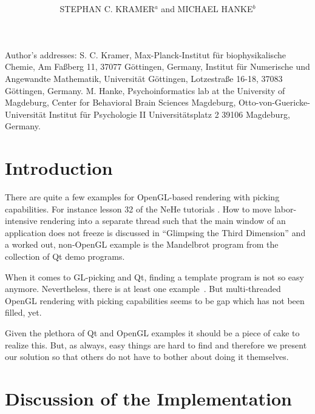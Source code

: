 \documentclass[prodmode,acmtopc]{acmsmall}
\title{
\mytitle
 }
\author{STEPHAN C. KRAMER$^a$  and MICHAEL HANKE$^b$
 \affil{$^a$Universit\"at G\"ottingen, $^b$Universit\"at Magdeburg}
 }
\begin{document}
                 \begin{bottomstuff}
                 Author's addresses: S. C. Kramer, 
                 Max-Planck-Institut f\"ur biophysikalische Chemie,
                 Am Fa\ss{}berg 11,
                 37077 G\"ottingen, Germany,
                 Institut f\"ur Numerische und Angewandte Mathematik, 
                 Universit\"at G\"ottingen, 
                 Lotzestra\ss{}e 16-18, 37083 G\"ottingen, Germany.
                 M. Hanke,
                 Psychoinformatics lab at the University of Magdeburg,
                 Center for Behavioral Brain Sciences Magdeburg,
                 Otto-von-Guericke-Universität
                 Institut  f\"ur Psychologie II
                 Universit\"atsplatz 2
                 39106 Magdeburg, Germany.
                 \end{bottomstuff}
                
 \maketitle %


\section{Introduction}
\label{sec:Introduction}

There are quite a few examples for OpenGL-based rendering with picking capabilities.
%
For instance lesson 32 of the NeHe tutorials \cite{nehe32}. 
%
How to move labor-intensive rendering into a separate thread such that the main window of an application does not freeze is discussed in ``Glimpsing the Third Dimension'' \cite{glimpse3d} and a worked out, non-OpenGL example is the Mandelbrot program from the collection of Qt demo programs.

When it comes to GL-picking and Qt, finding a template program is not so easy anymore.
%
Nevertheless, there is at least one example~\cite{Blanchette2008}.
%
But multi-threaded OpenGL rendering with picking capabilities seems to be gap which has not been filled, yet.

Given the plethora of Qt and OpenGL examples it should be a piece of cake to realize this.
%
But, as always, easy things are hard to find and therefore we present our solution so that others do not have to bother about doing it themselves.




\section{Discussion of the Implementation}
\end{document}
